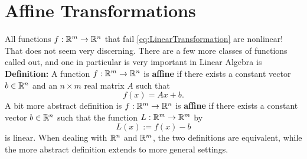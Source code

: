 \section{Affine Transformations}

All functions $f:\mathbb R^m \to \mathbb R^n$ that fail \eqref{eq:LinearTransformation} are nonlinear! That does not seem very discerning. There are a few more classes of functions called out, and one in particular is very important in Linear Algebra is
\textbf{Definition:} A function $f:\mathbb R^m \to \mathbb R^n$ is \textbf{affine} if there exists a constant vector $b \in \mathbb R^n$ and an $n \times m$ real matrix $A$ such that
\begin{equation}
    \label{eq:DefAffineFunction}
    f(x)= Ax + b.
\end{equation}
A bit more abstract definition is $f:\mathbb R^m \to \mathbb R^n$ is \textbf{affine} if there exists a constant vector $b \in \mathbb R^n$ such that the function $L:\mathbb R^m \to \mathbb R^m$ by
$$L(x):=f(x)-b $$
is linear. 
When dealing with $\mathbb R^n$ and $\mathbb R^m$, the two definitions are equivalent, while the more abstract definition extends to  more general settings.


